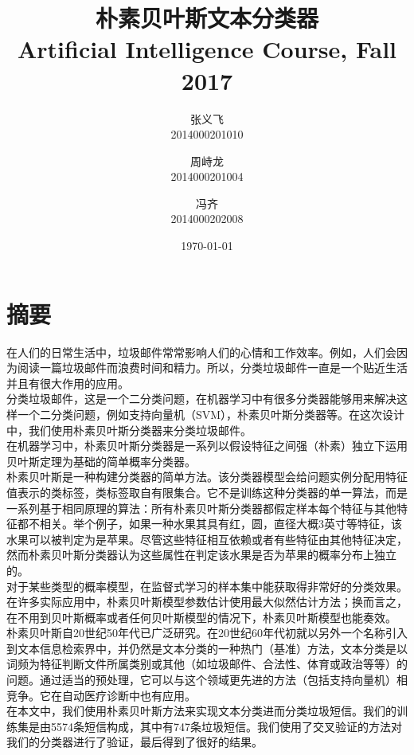 \documentclass[a4paper, twocolumn, 12pt]{article}
\title{\huge {\textbf{朴素贝叶斯文本分类器}}\\[1ex]\small Artificial Intelligence Course, Fall 2017}
\author{
    张义飞\\2014000201010
    \and 周峙龙\\2014000201004
    \and 冯齐\\2014000202008
}
\date{\today}
\begin{document}
\maketitle

\section{摘要}

在人们的日常生活中，垃圾邮件常常影响人们的心情和工作效率。例如，人们会因为阅读一篇垃圾邮件而浪费时间和精力。所以，分类垃圾邮件一直是一个贴近生活并且有很大作用的应用。\\

分类垃圾邮件，这是一个二分类问题，在机器学习中有很多分类器能够用来解决这样一个二分类问题，例如支持向量机（SVM），朴素贝叶斯分类器等。在这次设计中，我们使用朴素贝叶斯分类器来分类垃圾邮件。\\

在机器学习中，朴素贝叶斯分类器是一系列以假设特征之间强（朴素）独立下运用贝叶斯定理为基础的简单概率分类器。\\

朴素贝叶斯是一种构建分类器的简单方法。该分类器模型会给问题实例分配用特征值表示的类标签，类标签取自有限集合。它不是训练这种分类器的单一算法，而是一系列基于相同原理的算法：所有朴素贝叶斯分类器都假定样本每个特征与其他特征都不相关。举个例子，如果一种水果其具有红，圆，直径大概3英寸等特征，该水果可以被判定为是苹果。尽管这些特征相互依赖或者有些特征由其他特征决定，然而朴素贝叶斯分类器认为这些属性在判定该水果是否为苹果的概率分布上独立的。\\

对于某些类型的概率模型，在监督式学习的样本集中能获取得非常好的分类效果。在许多实际应用中，朴素贝叶斯模型参数估计使用最大似然估计方法；换而言之，在不用到贝叶斯概率或者任何贝叶斯模型的情况下，朴素贝叶斯模型也能奏效。\\

朴素贝叶斯自20世纪50年代已广泛研究。在20世纪60年代初就以另外一个名称引入到文本信息检索界中，并仍然是文本分类的一种热门（基准）方法，文本分类是以词频为特征判断文件所属类别或其他（如垃圾邮件、合法性、体育或政治等等）的问题。通过适当的预处理，它可以与这个领域更先进的方法（包括支持向量机）相竞争。它在自动医疗诊断中也有应用。\\

在本文中，我们使用朴素贝叶斯方法来实现文本分类进而分类垃圾短信。我们的训练集是由5574条短信构成，其中有747条垃圾短信。我们使用了交叉验证的方法对我们的分类器进行了验证，最后得到了很好的结果。\\
\end{document}
